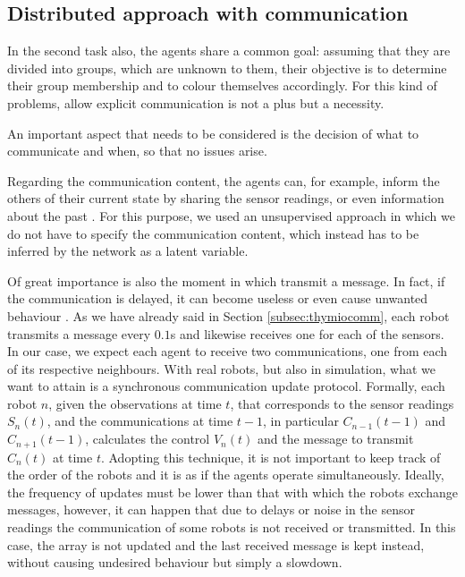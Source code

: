 \subsection{Distributed approach with communication}
\label{subsec:comm}
In the second task also, the agents share a common goal: assuming that they are 
divided into groups, which are unknown to them, their objective is to determine  
their group membership and to colour themselves accordingly. 
For this kind of problems, allow explicit communication is not a plus but a 
necessity.

An important aspect that needs to be considered is the decision of what to 
communicate and when, so that no issues arise.

Regarding the communication content, the agents can, for example, inform the 
others of their current state by sharing the sensor readings, or even information 
about the past \cite[][]{guestrin2002coordinated, panait2005cooperative}.
For this purpose, we used an unsupervised approach in which we do not have to 
specify the communication content, which instead has to be inferred by the 
network as a latent variable.

Of great importance is also the moment in which transmit a message. In fact, if the 
communication is delayed, it can become useless or even cause unwanted 
behaviour \cite[][]{stone2000multiagent}.
As we have already said in Section \ref{subsec:thymiocomm}, each robot transmits 
a message every $0.1$s and likewise receives one for each of the sensors. In 
our case, we expect each agent to receive two communications, one from each of 
its respective neighbours. With real robots, but also in simulation, what we want to 
attain is a synchronous communication update protocol. Formally, each robot 
$n$, given the observations at time $t$, that corresponds to the sensor readings 
$S_n(t)$, and the communications at time $t-1$, in particular $C_{n-1}(t-1)$ 
and $C_{n+1}(t-1)$, calculates the control $V_n(t)$ and the message to 
transmit $C_n(t)$ at time $t$. 
Adopting this technique, it is not important to keep track of the order of the 
robots and it is as if the agents operate simultaneously. 
Ideally, the frequency of updates must be lower than that with which the 
robots exchange messages, however, it can happen that due to delays or 
noise in the sensor readings the communication of some robots is not 
received or transmitted. In this case, the array is not updated and the last 
received message is kept instead, without causing undesired behaviour but simply 
a slowdown.

